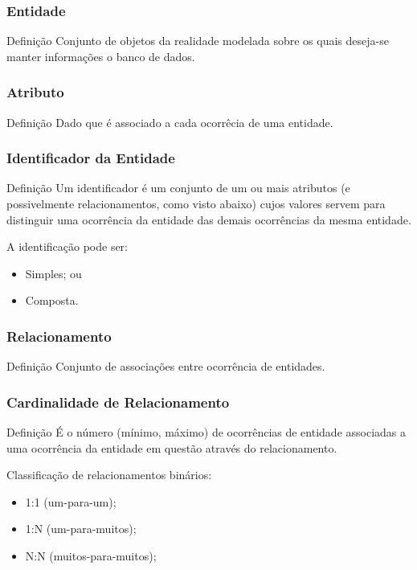 \documentclass{beamer}
\begin{document}
\begin{frame}
\frametitle{Entidade}

\begin{block}{Definição}
	Conjunto de objetos da realidade modelada sobre os quais deseja-se manter
	informações o banco de dados.
\end{block} 
\end{frame}

\begin{frame}
\frametitle{Atributo}

\begin{block}{Definição}
	Dado que é associado a cada ocorrêcia de uma entidade.
\end{block} 
\end{frame}

\begin{frame}
\frametitle{Identificador da Entidade}

\begin{block}{Definição}
	Um identificador é um conjunto de um ou mais atributos (e possivelmente
	relacionamentos, como visto abaixo) cujos valores servem para distinguir
	uma ocorrência da entidade das demais ocorrências da mesma entidade.
\end{block} \vfill

A identificação pode ser:
\begin{itemize}
	\item Simples; ou
	\item Composta.
\end{itemize}
\end{frame}

\begin{frame}
\frametitle{Relacionamento}

\begin{block}{Definição}
	Conjunto de associações entre ocorrência de entidades.
\end{block}
\end{frame}

\begin{frame}
\frametitle{Cardinalidade de Relacionamento}

\begin{block}{Definição}
É o número (mínimo, máximo) de ocorrências de entidade associadas a
uma ocorrência da entidade em questão através do relacionamento.
\end{block} \vfill

	Classificação de relacionamentos binários:
	\begin{itemize}
	\item 1:1 (um-para-um);
	\item 1:N (um-para-muitos);
	\item N:N (muitos-para-muitos);
	\end{itemize}
\end{frame}
\end{document}
